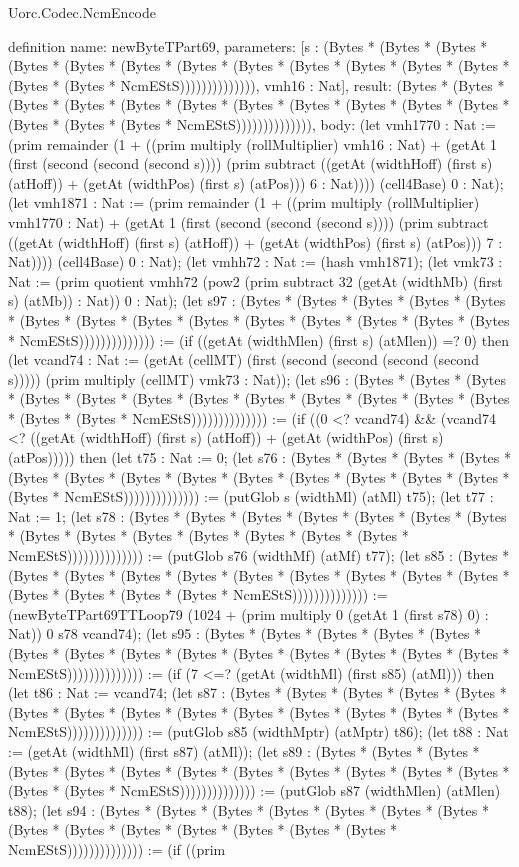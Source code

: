 \begin{lexlean}{Uorc.Codec.NcmEncode}
\begin{semanticmodule}
definition{
  name: newByteTPart69,
  parameters: [s : (Bytes * (Bytes * (Bytes * (Bytes * (Bytes * (Bytes * (Bytes * (Bytes * (Bytes * (Bytes * (Bytes * (Bytes * (Bytes * (Bytes * NcmEStS)))))))))))))), vmh16 : Nat],
  result: (Bytes * (Bytes * (Bytes * (Bytes * (Bytes * (Bytes * (Bytes * (Bytes * (Bytes * (Bytes * (Bytes * (Bytes * (Bytes * (Bytes * NcmEStS)))))))))))))),
  body: (let vmh1770 : Nat := (prim remainder (1 + ((prim multiply (rollMultiplier) vmh16 : Nat) + (getAt 1 (first (second (second (second s)))) (prim subtract ((getAt (widthHoff) (first s) (atHoff)) + (getAt (widthPos) (first s) (atPos))) 6 : Nat)))) (cell4Base) 0 : Nat); (let vmh1871 : Nat := (prim remainder (1 + ((prim multiply (rollMultiplier) vmh1770 : Nat) + (getAt 1 (first (second (second (second s)))) (prim subtract ((getAt (widthHoff) (first s) (atHoff)) + (getAt (widthPos) (first s) (atPos))) 7 : Nat)))) (cell4Base) 0 : Nat); (let vmhh72 : Nat := (hash vmh1871); (let vmk73 : Nat := (prim quotient vmhh72 (pow2 (prim subtract 32 (getAt (widthMb) (first s) (atMb)) : Nat)) 0 : Nat); (let s97 : (Bytes * (Bytes * (Bytes * (Bytes * (Bytes * (Bytes * (Bytes * (Bytes * (Bytes * (Bytes * (Bytes * (Bytes * (Bytes * (Bytes * NcmEStS)))))))))))))) := (if ((getAt (widthMlen) (first s) (atMlen)) =? 0) then (let vcand74 : Nat := (getAt (cellMT) (first (second (second (second (second s))))) (prim multiply (cellMT) vmk73 : Nat)); (let s96 : (Bytes * (Bytes * (Bytes * (Bytes * (Bytes * (Bytes * (Bytes * (Bytes * (Bytes * (Bytes * (Bytes * (Bytes * (Bytes * (Bytes * NcmEStS)))))))))))))) := (if ((0 <? vcand74) && (vcand74 <? ((getAt (widthHoff) (first s) (atHoff)) + (getAt (widthPos) (first s) (atPos))))) then (let t75 : Nat := 0; (let s76 : (Bytes * (Bytes * (Bytes * (Bytes * (Bytes * (Bytes * (Bytes * (Bytes * (Bytes * (Bytes * (Bytes * (Bytes * (Bytes * (Bytes * NcmEStS)))))))))))))) := (putGlob s (widthMl) (atMl) t75); (let t77 : Nat := 1; (let s78 : (Bytes * (Bytes * (Bytes * (Bytes * (Bytes * (Bytes * (Bytes * (Bytes * (Bytes * (Bytes * (Bytes * (Bytes * (Bytes * (Bytes * NcmEStS)))))))))))))) := (putGlob s76 (widthMf) (atMf) t77); (let s85 : (Bytes * (Bytes * (Bytes * (Bytes * (Bytes * (Bytes * (Bytes * (Bytes * (Bytes * (Bytes * (Bytes * (Bytes * (Bytes * (Bytes * NcmEStS)))))))))))))) := (newByteTPart69TTLoop79 (1024 + (prim multiply 0 (getAt 1 (first s78) 0) : Nat)) 0 s78 vcand74); (let s95 : (Bytes * (Bytes * (Bytes * (Bytes * (Bytes * (Bytes * (Bytes * (Bytes * (Bytes * (Bytes * (Bytes * (Bytes * (Bytes * (Bytes * NcmEStS)))))))))))))) := (if (7 <=? (getAt (widthMl) (first s85) (atMl))) then (let t86 : Nat := vcand74; (let s87 : (Bytes * (Bytes * (Bytes * (Bytes * (Bytes * (Bytes * (Bytes * (Bytes * (Bytes * (Bytes * (Bytes * (Bytes * (Bytes * (Bytes * NcmEStS)))))))))))))) := (putGlob s85 (widthMptr) (atMptr) t86); (let t88 : Nat := (getAt (widthMl) (first s87) (atMl)); (let s89 : (Bytes * (Bytes * (Bytes * (Bytes * (Bytes * (Bytes * (Bytes * (Bytes * (Bytes * (Bytes * (Bytes * (Bytes * (Bytes * (Bytes * NcmEStS)))))))))))))) := (putGlob s87 (widthMlen) (atMlen) t88); (let s94 : (Bytes * (Bytes * (Bytes * (Bytes * (Bytes * (Bytes * (Bytes * (Bytes * (Bytes * (Bytes * (Bytes * (Bytes * (Bytes * (Bytes * NcmEStS)))))))))))))) := (if ((prim }
\end{semanticmodule}
\end{lexlean}
